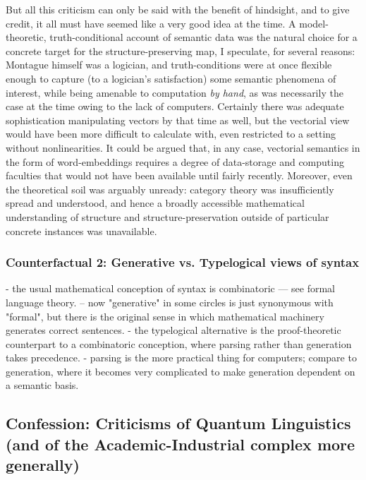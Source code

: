 But all this criticism can only be said with the benefit of hindsight, and to give credit, it all must have seemed like a very good idea at the time. A model-theoretic, truth-conditional account of semantic data was the natural choice for a concrete target for the structure-preserving map, I speculate, for several reasons: Montague himself was a logician, and truth-conditions were at once flexible enough to capture (to a logician's satisfaction) some semantic phenomena of interest, while being amenable to computation \emph{by hand}, as was necessarily the case at the time owing to the lack of computers. Certainly there was adequate sophistication manipulating vectors by that time as well, but the vectorial view would have been more difficult to calculate with, even restricted to a setting without nonlinearities. It could be argued that, in any case, vectorial semantics in the form of word-embeddings requires a degree of data-storage and computing faculties that would not have been available until fairly recently. Moreover, even the theoretical soil was arguably unready: category theory was insufficiently spread and understood, and hence a broadly accessible mathematical understanding of structure and structure-preservation outside of particular concrete instances was unavailable.

\subsubsection{Counterfactual 2: Generative vs. Typelogical views of syntax}

- the usual mathematical conception of syntax is combinatoric --- see formal language theory.
-- now "generative" in some circles is just synonymous with "formal", but there is the original sense in which mathematical machinery generates correct sentences.
- the typelogical alternative is the proof-theoretic counterpart to a combinatoric conception, where parsing rather than generation takes precedence.
- parsing is the more practical thing for computers; compare to generation, where it becomes very complicated to make generation dependent on a semantic basis.

\subsection{Confession: Criticisms of Quantum Linguistics (and of the Academic-Industrial complex more generally)}

